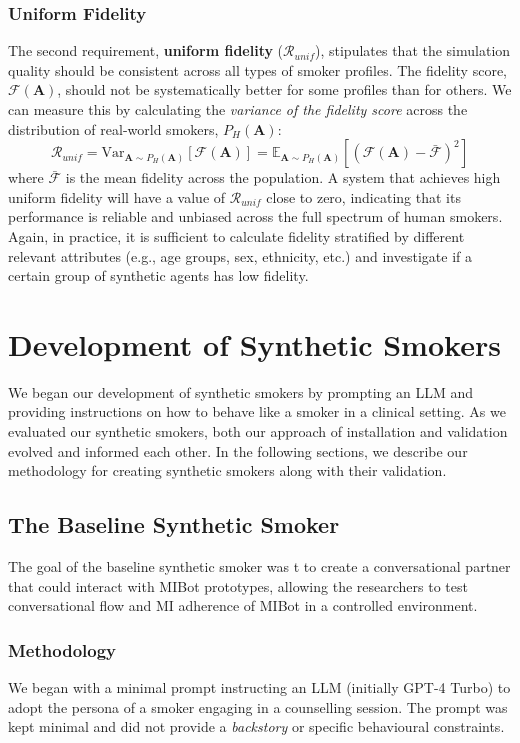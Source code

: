 \subsubsection{Uniform Fidelity}

The second requirement, \textbf{uniform fidelity} ($\mathcal{R}_{unif}$), stipulates that the simulation quality should be consistent across all types of smoker profiles. The fidelity score, $\mathcal{F}(\textbf{A})$, should not be systematically better for some profiles than for others. We can measure this by calculating the \textit{variance of the fidelity score} across the distribution of real-world smokers, $P_H(\textbf{A})$:
$$\mathcal{R}_{unif} = \text{Var}_{\textbf{A} \sim P_H(\textbf{A})}[\mathcal{F}(\textbf{A})] = \mathbb{E}_{\textbf{A} \sim P_H(\textbf{A})} [(\mathcal{F}(\textbf{A}) - \bar{\mathcal{F}})^2]$$
where $\bar{\mathcal{F}}$ is the mean fidelity across the population. A system that achieves high uniform fidelity will have a value of $\mathcal{R}_{unif}$ close to zero, indicating that its performance is reliable and unbiased across the full spectrum of human smokers. Again, in practice, it is sufficient to calculate fidelity stratified by different relevant attributes (e.g., age groups, sex, ethnicity, etc.) and investigate if a certain group of synthetic agents has low fidelity.


\section{Development of Synthetic Smokers}
We began our development of synthetic smokers by prompting an LLM and providing instructions on how to behave like a smoker in a clinical setting. As we evaluated our synthetic smokers, both our approach of installation and validation evolved and informed each other. In the following sections, we describe our methodology for creating synthetic smokers along with their validation.


\subsection{The Baseline Synthetic Smoker}
\label{sec:synthetic-smoker-baseline}
The goal of the baseline synthetic smoker was t to create a conversational partner that could interact with MIBot prototypes, allowing the researchers to test conversational flow and MI adherence of MIBot in a controlled environment.


\subsubsection{Methodology}
We began with a minimal prompt instructing an LLM (initially GPT-4 Turbo) to adopt the persona of a smoker engaging in a counselling session. The prompt was kept minimal and did not provide a \emph{backstory} or specific behavioural constraints.


